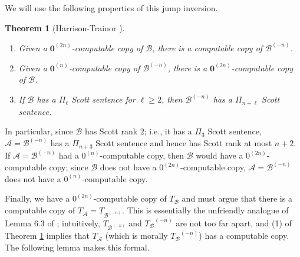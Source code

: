\documentclass{article}
\newcommand{\Inv}[2]{{#2}^{(-#1)}}
\newtheorem{thm}{Theorem}[section]
\theoremstyle{definition}
\begin{document}
	We will use the following properties of this jump inversion.
	
	\begin{thm}[Harrison-Trainor \cite{unfriendly}]\label{thm:unfriendly}{\ }
		\begin{enumerate}
			\item Given a $\mathbf{0}^{(2n)}$-computable copy of $\mathcal{B}$, there is a computable copy of $\Inv{n}{\mathcal{B}}$.
			\item Given a $\mathbf{0}^{(n)}$-computable copy of $\Inv{n}{\mathcal{B}}$, there is a $\mathbf{0}^{(2n)}$-computable copy of $\mathcal{B}$.
			\item If $\mathcal{B}$ has a $\Pi_\ell$ Scott sentence for $\ell \geq 2$, then $\Inv{n}{\mathcal{B}}$ has a $\Pi_{n+\ell}$ Scott sentence.
		\end{enumerate}
	\end{thm}
	
	In particular, since $\mathcal{B}$ has Scott rank $2$; i.e., it has a $\Pi_3$ Scott sentence, $\mathcal{A} = \Inv{n}{\mathcal{B}}$ has a $\Pi_{n+3}$ Scott sentence and hence has Scott rank at most $n+2$.
	If $\mathcal{A} = \Inv{n}{\mathcal{B}}$ had a $0^{(n)}$-computable copy, then $\mathcal{B}$ would have a $0^{(2n)}$-computable copy; since $\mathcal{B}$ does not have a $0^{(2n)}$-computable copy, $\mathcal{A} =\Inv{n}{\mathcal{B}}$ does not have a $0^{(n)}$-computable copy.
	
	Finally, we have a $0^{(2n)}$-computable copy of $T_{\mathcal{B}}$ and must argue that there is a computable copy of $T_{\mathcal{A}} = T_{\Inv{n}{\mathcal{B}}}$. This is essentially the unfriendly analogue of Lemma 6.3 of \cite{HTMontalban}; intuitively, $T_{\Inv{n}{\mathcal{B}}}$ and $\Inv{n}{T_{\mathcal{B}}}$ are not too far apart, and (1) of Theorem \ref{thm:unfriendly} implies that $T_{\mathcal{A}}$ (which is morally $\Inv{n}{T_{\mathcal{B}}}$) has a computable copy. The following lemma makes this formal.
	
\end{document}
